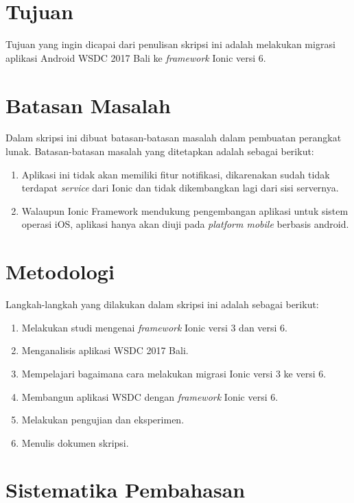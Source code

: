 \section{Tujuan}
\label{sec:tujuan}
Tujuan yang ingin dicapai dari penulisan skripsi ini adalah melakukan migrasi aplikasi Android WSDC 2017 Bali ke {\it framework} Ionic versi 6.

\section{Batasan Masalah}
\label{sec:batasan}
Dalam skripsi ini dibuat batasan-batasan masalah dalam pembuatan perangkat lunak.  Batasan-batasan masalah yang ditetapkan adalah sebagai berikut:

\begin{enumerate}
    \item Aplikasi ini tidak akan memiliki fitur notifikasi, dikarenakan sudah tidak terdapat \textit{service} dari Ionic dan tidak dikembangkan lagi dari sisi servernya. 
    
    \item Walaupun Ionic Framework mendukung pengembangan aplikasi untuk sistem operasi iOS, aplikasi hanya akan diuji pada \textit{platform mobile} berbasis android.
    
\end{enumerate}


\section{Metodologi}
\label{sec:metlit}

Langkah-langkah yang dilakukan dalam skripsi ini adalah sebagai berikut:

\begin{enumerate}
	\item Melakukan studi mengenai {\it framework} Ionic versi 3 dan versi 6.
	\item Menganalisis aplikasi WSDC 2017 Bali.
	\item Mempelajari bagaimana cara melakukan migrasi Ionic versi 3 ke versi 6.
	\item Membangun aplikasi WSDC dengan {\it framework} Ionic versi 6. 
	\item Melakukan pengujian dan eksperimen.
	\item Menulis dokumen skripsi.
\end{enumerate}


\section{Sistematika Pembahasan}
\label{sec:sispem}

